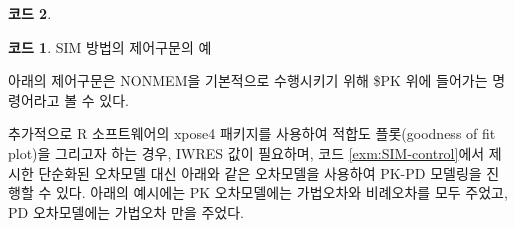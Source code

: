 \documentclass[
  10pt,
  krantz2,
  a4paper]{krantz}
\newenvironment{Shaded}{\begin{snugshade}}{\end{snugshade}}
\newcommand{\DecValTok}[1]{\textcolor[rgb]{0.00,0.00,0.81}{#1}}
\newcommand{\ErrorTok}[1]{\textcolor[rgb]{0.64,0.00,0.00}{\textbf{#1}}}
\newcommand{\KeywordTok}[1]{\textcolor[rgb]{0.13,0.29,0.53}{\textbf{#1}}}
\newcommand{\NormalTok}[1]{#1}
\newcommand{\OperatorTok}[1]{\textcolor[rgb]{0.81,0.36,0.00}{\textbf{#1}}}
\newcommand{\StringTok}[1]{\textcolor[rgb]{0.31,0.60,0.02}{#1}}
\theoremstyle{definition}
\theoremstyle{definition}
\newtheorem{example}{코드}[chapter]
\theoremstyle{definition}
\theoremstyle{remark}
\begin{document}
\begin{example}
\begin{example}

\protect\hypertarget{exm:SIM-control}{}{\label{exm:SIM-control} }SIM 방법의 제어구문의 예

\end{example}
\end{example}

아래의 제어구문은 NONMEM을 기본적으로 수행시키기 위해 \$PK 위에 들어가는 명령어라고 볼 수 있다.

\begin{Shaded}
\end{Shaded}

추가적으로 R 소프트웨어의 xpose4 패키지를 사용하여 적합도 플롯(goodness of fit plot)을 그리고자 하는 경우, IWRES 값이 필요하며, 코드 \ref{exm:SIM-control}에서 제시한 단순화된 오차모델 대신 아래와 같은 오차모델을 사용하여 PK-PD 모델링을 진행할 수 있다. 아래의 예시에는 PK 오차모델에는 가법오차와 비례오차를 모두 주었고, PD 오차모델에는 가법오차 만을 주었다.
\end{document}

